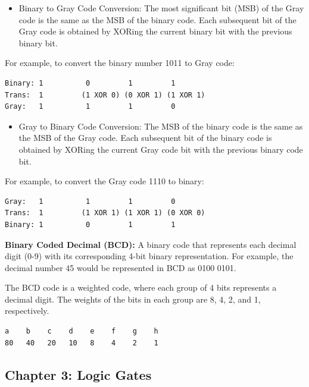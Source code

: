 \documentclass[
  a4paper,
]{article}
\providecommand{\tightlist}{%
  \setlength{\itemsep}{0pt}\setlength{\parskip}{0pt}}
\begin{document}
\begin{itemize}
\tightlist
\item
  Binary to Gray Code Conversion: The most significant bit (MSB) of the
  Gray code is the same as the MSB of the binary code. Each subsequent
  bit of the Gray code is obtained by XORing the current binary bit with
  the previous binary bit.
\end{itemize}

For example, to convert the binary number 1011 to Gray code:

\begin{verbatim}
Binary: 1          0         1         1
Trans:  1         (1 XOR 0) (0 XOR 1) (1 XOR 1)
Gray:   1          1         1         0
\end{verbatim}

\begin{itemize}
\tightlist
\item
  Gray to Binary Code Conversion: The MSB of the binary code is the same
  as the MSB of the Gray code. Each subsequent bit of the binary code is
  obtained by XORing the current Gray code bit with the previous binary
  code bit.
\end{itemize}

For example, to convert the Gray code 1110 to binary:

\begin{verbatim}
Gray:   1          1         1         0
Trans:  1         (1 XOR 1) (1 XOR 1) (0 XOR 0)
Binary: 1          0         1         1
\end{verbatim}

\textbf{Binary Coded Decimal (BCD):} A binary code that represents each
decimal digit (0-9) with its corresponding 4-bit binary representation.
For example, the decimal number 45 would be represented in BCD as 0100
0101.

The BCD code is a weighted code, where each group of 4 bits represents a
decimal digit. The weights of the bits in each group are 8, 4, 2, and 1,
respectively.

\begin{verbatim}
a    b    c    d    e    f    g    h
80   40   20   10   8    4    2    1
\end{verbatim}

\subsection{Chapter 3: Logic Gates}\label{chapter-3-logic-gates}
\end{document}
